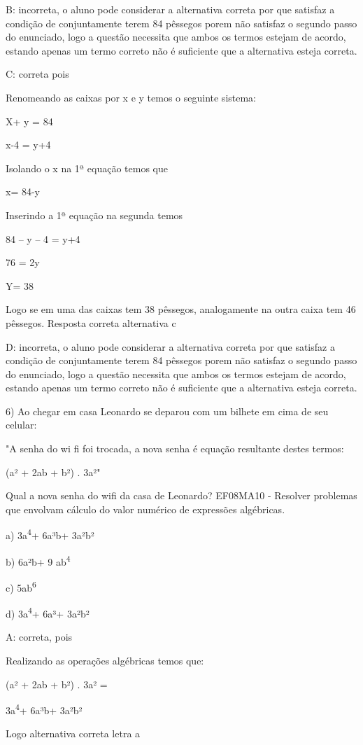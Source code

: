 B: incorreta, o aluno pode considerar a alternativa correta por que
satisfaz a condição de conjuntamente terem 84 pêssegos porem não
satisfaz o segundo passo do enunciado, logo a questão necessita que
ambos os termos estejam de acordo, estando apenas um termo correto não é
suficiente que a alternativa esteja correta.

C: correta pois

Renomeando as caixas por x e y temos o seguinte sistema:

X+ y = 84

x-4 = y+4

Isolando o x na 1ª equação temos que

x= 84-y

Inserindo a 1ª equação na segunda temos

84 -- y -- 4 = y+4

76 = 2y

Y= 38

Logo se em uma das caixas tem 38 pêssegos, analogamente na outra caixa
tem 46 pêssegos. Resposta correta alternativa c

D: incorreta, o aluno pode considerar a alternativa correta por que
satisfaz a condição de conjuntamente terem 84 pêssegos porem não
satisfaz o segundo passo do enunciado, logo a questão necessita que
ambos os termos estejam de acordo, estando apenas um termo correto não é
suficiente que a alternativa esteja correta.

6) Ao chegar em casa Leonardo se deparou com um bilhete em cima de seu
celular:

"A senha do wi fi foi trocada, a nova senha é equação resultante destes
termos:

(a² + 2ab + b²) . 3a²"

Qual a nova senha do wifi da casa de Leonardo? EF08MA10 - Resolver
problemas que envolvam cálculo do valor numérico de expressões
algébricas.

a) 3a\textsuperscript{4}+ 6a³b+ 3a²b²

b) 6a²b+ 9 ab\textsuperscript{4}

c) 5ab\textsuperscript{6}

d) 3a\textsuperscript{4}+ 6a³+ 3a²b²

A: correta, pois

Realizando as operações algébricas temos que:

(a² + 2ab + b²) . 3a² =

3a\textsuperscript{4}+ 6a³b+ 3a²b²

Logo alternativa correta letra a

